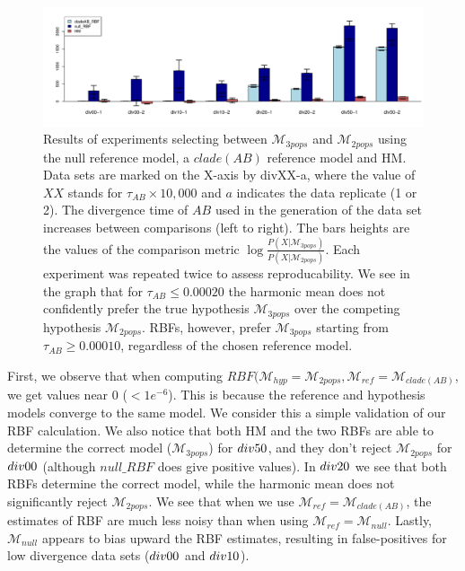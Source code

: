 \documentclass[11pt]{article}
\newcommand{\M}{\mathcal{M}}
\newcommand{\Mref}{\M_{ref}}
\newcommand{\Mhyp}{\M_{hyp}}
\newcommand{\1}{\mathbbm{1}}
\begin{document}
\begin{figure}[h]
 

\includegraphics[scale=0.4]{results/results-divAB-select}
\captionsetup{width=0.8\textwidth}
\caption{
Results of experiments selecting between $\M_{3pops}$ and $\M_{2pops}$ using the null reference model, a $clade(AB)$ reference model and HM.
%
Data sets are marked on the X-axis by divXX-a, where the value of $XX$ stands for $\tau_{AB} \times 10,000$ and $a$ indicates the data replicate (1 or 2).
%
The divergence time of $AB$ used in the generation of the data set increases between comparisons (left to right).
%
The bars heights are the values of the comparison metric $\log{\frac{P(X|\M_{3pops})}{P(X|\M_{2pops})}}$.
%
Each experiment was repeated twice to assess reproducability. We see in the graph that for $\tau_{AB} \leq 0.00020$ the harmonic mean does not confidently prefer the true hypothesis $\M_{3pops}$ over the competing hypothesis $\M_{2pops}$.
%
RBFs, however, prefer $\M_{3pops}$ starting from $\tau_{AB} \geq 0.00010$, regardless of the chosen reference model.
%
}
\label{fig:results-divAB}
\end{figure}


First, we observe that when computing $RBF(\Mhyp=\M_{2pops}, \Mref=\M_{clade(AB)}$, we get values near 0 ($<1e^{-6}$). This is because the reference and hypothesis models converge to the same model. We consider this a simple validation of our RBF calculation. 
%
We also notice that both HM and the two RBFs are able to determine the correct model ($\M_{3pops}$) for $div\-50$, and they don't reject $\M_{2pops}$ for $div\-00$ (although $null\_RBF$ does give positive values). 
%
In $div\-20$ we see that both RBFs determine the correct model, while the harmonic mean does not significantly reject $\M_{2pops}$.
%
We see that when we use $\Mref = \M_{clade(AB)}$, the estimates of RBF are much less noisy than when using $\Mref = \M_{null}$.
%
Lastly, $\M_{null}$ appears to bias upward the RBF estimates, resulting in false-positives for low divergence data sets ($div\-00$ and $div\-10$).
\end{document}
